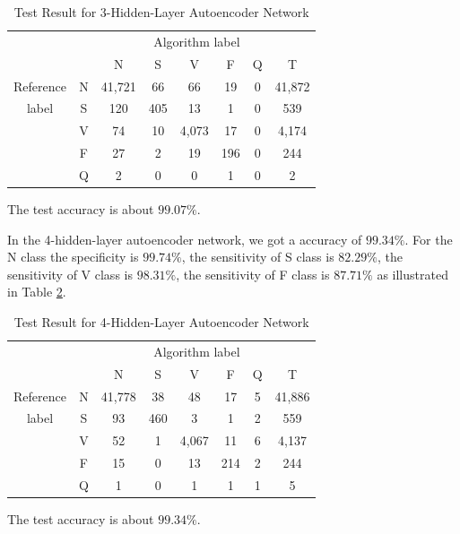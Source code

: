 \documentclass[journal]{IEEEtran}
\begin{document}
\begin{table}[!htbp]
\begin{center}
\begin{threeparttable}
\caption{Test Result for 3-Hidden-Layer Autoencoder Network}
\label{table6}
\begin{tabular}{cccccccc}
\hline
\multicolumn{6}{r}{Algorithm label} \\
\cline{3-7}
			&   & N      & S    & V     & F   & Q  & T\\
\hline
 Reference  & N & 41,721 &  66  &  66   & 19  &  0 &  41,872 \\
	label   & S &  120   & 405  &  13   & 1   & 0  &  539\\
			& V &  74    & 10   & 4,073 & 17  & 0  &  4,174\\
			& F &  27    & 2    & 19    & 196 & 0  &  244\\
			& Q &  2     & 0    & 0     & 1   & 0  &  2\\
\hline
\end{tabular}
\begin{tablenotes}
\item The test accuracy is about $99.07\%$.
\end{tablenotes}
\end{threeparttable}
\end{center}
\end{table}

In the 4-hidden-layer autoencoder network, we got a accuracy of $99.34\%$. For the N class the specificity is $99.74\%$, the sensitivity of S class is $82.29\%$, the sensitivity of V class is $98.31\%$, the sensitivity of F class is $87.71\%$ as illustrated in Table \ref{table7}. 

\begin{table}[!htbp]
\begin{center}
\begin{threeparttable}
\caption{Test Result for 4-Hidden-Layer Autoencoder Network}
\label{table7}
\begin{tabular}{cccccccc}
\hline
\multicolumn{6}{r}{Algorithm label} \\
\cline{3-7}
		&  & N & S      & V    & F     & Q   & T\\
\hline
 Reference & N & 41,778 &  38  &  48   & 17  & 5  &  41,886 \\
	label  & S &  93    & 460  &   3   & 1   & 2  &  559\\
		   & V &  52    & 1    & 4,067 & 11  & 6  &  4,137\\
		   & F &  15    & 0    & 13    & 214 & 2  &  244\\
		   & Q &  1     & 0    & 1     & 1   & 1  &  5\\
\hline
\end{tabular}
\begin{tablenotes}
\item The test accuracy is about $99.34\%$.
\end{tablenotes}
\end{threeparttable}
\end{center}
\end{table}
\end{document}
